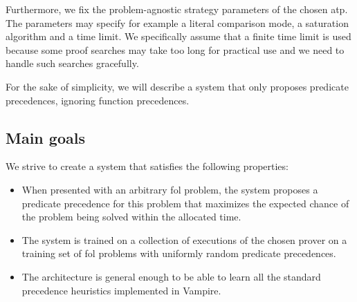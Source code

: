 Furthermore, we fix the problem-agnostic strategy parameters of the chosen \gls{atp}.
The parameters may specify for example a literal comparison mode, a saturation algorithm
and a time limit.
We specifically assume that a finite time limit is used
because some proof searches may take too long for practical use\cite{?}
and we need to handle such searches gracefully.


For the sake of simplicity,
we will describe a system that only proposes predicate precedences, ignoring function precedences.

\subsection{Main goals}

We strive to create a system that satisfies the following properties:

\begin{itemize}
	\item When presented with an arbitrary \gls{fol} problem,
	the system proposes a predicate precedence for this problem
	that maximizes the expected chance of the problem being solved
	within the allocated time.
	
	
	\item The system is trained on a collection of executions of the chosen prover
	on a training set of \gls{fol} problems
	with uniformly random predicate precedences.
	
	\item The architecture is general enough to be able to learn
	all the standard precedence heuristics implemented in Vampire.\cite{?}
\end{itemize}

